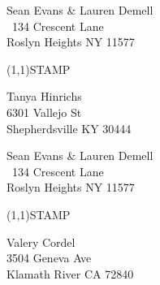 \documentclass[12pt]{article}
\begin{document}
\clearpage

\begin{minipage}{.5\linewidth} \noindent
Sean Evans \& Lauren Demell\\\ 
134 Crescent Lane\\ 
Roslyn Heights NY 11577
\end{minipage}
\begin{minipage}{.5\linewidth \hspace{-.2in} \vspace{-.3in}}
\begin{flushright}
\framebox(1,1){STAMP}
\end{flushright}
\end{minipage}

\begin{center} \begin{Huge} \vspace*{\fill}
Tanya Hinrichs\\
6301 Vallejo St\\
Shepherdsville KY 30444\\
\vspace{\fill} \end{Huge} \end{center}

\clearpage

\begin{minipage}{.5\linewidth} \noindent
Sean Evans \& Lauren Demell\\\ 
134 Crescent Lane\\ 
Roslyn Heights NY 11577
\end{minipage}
\begin{minipage}{.5\linewidth \hspace{-.2in} \vspace{-.3in}}
\begin{flushright}
\framebox(1,1){STAMP}
\end{flushright}
\end{minipage}

\begin{center} \begin{Huge} \vspace*{\fill}
Valery Cordel\\
3504 Geneva Ave\\
Klamath River CA 72840\\
\vspace{\fill} \end{Huge} \end{center}
\end{document}
